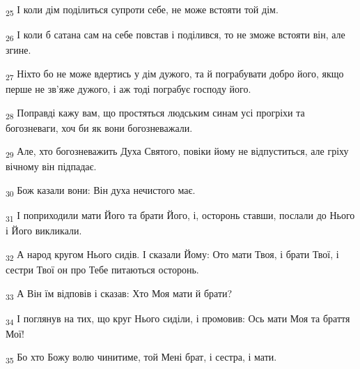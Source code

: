 \begin{tcolorbox}
\textsubscript{25} І коли дім поділиться супроти себе, не може встояти той дім.
\end{tcolorbox}
\begin{tcolorbox}
\textsubscript{26} І коли б сатана сам на себе повстав і поділився, то не зможе встояти він, але згине.
\end{tcolorbox}
\begin{tcolorbox}
\textsubscript{27} Ніхто бо не може вдертись у дім дужого, та й пограбувати добро його, якщо перше не зв'яже дужого, і аж тоді пограбує господу його.
\end{tcolorbox}
\begin{tcolorbox}
\textsubscript{28} Поправді кажу вам, що простяться людським синам усі прогріхи та богозневаги, хоч би як вони богозневажали.
\end{tcolorbox}
\begin{tcolorbox}
\textsubscript{29} Але, хто богозневажить Духа Святого, повіки йому не відпуститься, але гріху вічному він підпадає.
\end{tcolorbox}
\begin{tcolorbox}
\textsubscript{30} Бож казали вони: Він духа нечистого має.
\end{tcolorbox}
\begin{tcolorbox}
\textsubscript{31} І поприходили мати Його та брати Його, і, осторонь ставши, послали до Нього і Його викликали.
\end{tcolorbox}
\begin{tcolorbox}
\textsubscript{32} А народ кругом Нього сидів. І сказали Йому: Ото мати Твоя, і брати Твої, і сестри Твої он про Тебе питаються осторонь.
\end{tcolorbox}
\begin{tcolorbox}
\textsubscript{33} А Він їм відповів і сказав: Хто Моя мати й брати?
\end{tcolorbox}
\begin{tcolorbox}
\textsubscript{34} І поглянув на тих, що круг Нього сиділи, і промовив: Ось мати Моя та браття Мої!
\end{tcolorbox}
\begin{tcolorbox}
\textsubscript{35} Бо хто Божу волю чинитиме, той Мені брат, і сестра, і мати.
\end{tcolorbox}
